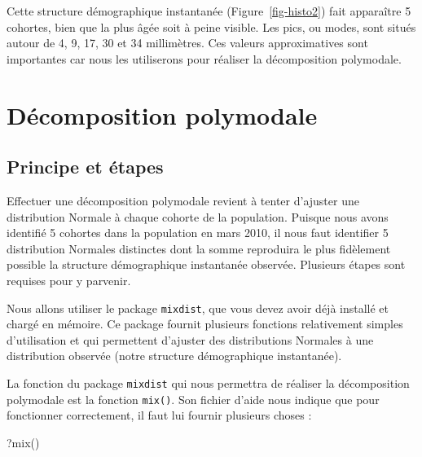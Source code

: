 \documentclass[
  french,
  a4paper,
  DIV=11,
  numbers=noendperiod,
  oneside]{scrreprt}
\newenvironment{Shaded}{}{}
\newcommand{\FunctionTok}[1]{\textcolor[rgb]{0.44,0.26,0.76}{#1}}
\newcommand{\NormalTok}[1]{\textcolor[rgb]{0.14,0.16,0.18}{#1}}
\begin{document}
\begin{tcolorbox}
{\begin{figure}[H]
\end{figure}%

}

Cette structure démographique instantanée (Figure~\ref{fig-histo2}) fait
apparaître 5 cohortes, bien que la plus âgée soit à peine visible. Les
pics, ou modes, sont situés autour de 4, 9, 17, 30 et 34 millimètres.
Ces valeurs approximatives sont importantes car nous les utiliserons
pour réaliser la décomposition polymodale.

\section{Décomposition polymodale}\label{duxe9composition-polymodale}

\subsection{Principe et étapes}\label{principe-et-uxe9tapes}

Effectuer une décomposition polymodale revient à tenter d'ajuster une
distribution Normale à chaque cohorte de la population. Puisque nous
avons identifié 5 cohortes dans la population en mars 2010, il nous faut
identifier 5 distribution Normales distinctes dont la somme reproduira
le plus fidèlement possible la structure démographique instantanée
observée. Plusieurs étapes sont requises pour y parvenir.

Nous allons utiliser le package \texttt{mixdist}, que vous devez avoir
déjà installé et chargé en mémoire. Ce package fournit plusieurs
fonctions relativement simples d'utilisation et qui permettent d'ajuster
des distributions Normales à une distribution observée (notre structure
démographique instantanée).

La fonction du package \texttt{mixdist} qui nous permettra de réaliser
la décomposition polymodale est la fonction \texttt{mix()}. Son fichier
d'aide nous indique que pour fonctionner correctement, il faut lui
fournir plusieurs choses :

\begin{Shaded}
\begin{Highlighting}[]
\NormalTok{?}\FunctionTok{mix}\NormalTok{()}
\end{Highlighting}
\end{Shaded}

\end{tcolorbox}
\end{document}
